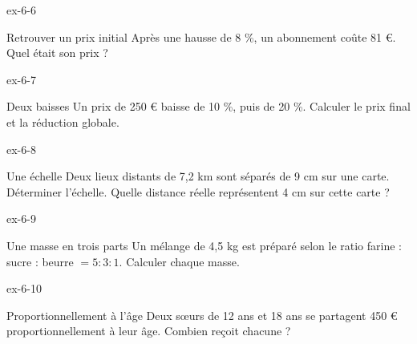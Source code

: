 \clearpage{}
\begin{blocLivre}{ex-6-6}\begin{exercice}[2]{Retrouver un prix initial}
Après une hausse de 8 \%, un abonnement coûte 81 €. Quel était son prix ?
\end{exercice}\end{blocLivre}
\begin{blocLivre}{ex-6-7}\begin{exercice}[2]{Deux baisses}
Un prix de 250 € baisse de 10 \%, puis de 20 \%. Calculer le prix final et la réduction globale.
\end{exercice}\end{blocLivre}
\begin{blocLivre}{ex-6-8}\begin{exercice}[2]{Une échelle}
Deux lieux distants de 7,2 km sont séparés de 9 cm sur une carte. Déterminer l’échelle. Quelle distance réelle représentent 4 cm sur cette carte ?
\end{exercice}\end{blocLivre}
\begin{blocLivre}{ex-6-9}\begin{exercice}[2]{Une masse en trois parts}
Un mélange de 4,5 kg est préparé selon le ratio farine : sucre : beurre $=5:3:1$. Calculer chaque masse.
\end{exercice}\end{blocLivre}
\begin{blocLivre}{ex-6-10}\begin{exercice}[2]{Proportionnellement à l’âge}
Deux sœurs de 12 ans et 18 ans se partagent 450 € proportionnellement à leur âge. Combien reçoit chacune ?
\end{exercice}\end{blocLivre}

